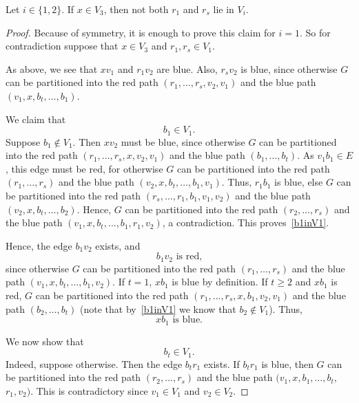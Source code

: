 \documentclass[a4paper,10pt]{article}
\begin{document}
\begin{claim}\label{xV3-b}
Let $i\in\{1,2\}$. If $x \in V_3$, then not both $r_1$ and $r_s$ lie in $V_i$.
\end{claim}
\begin{proof}
Because of symmetry, it is enough to prove this claim for $i=1$. So for contradiction suppose that $x \in V_3$ and $r_1,r_s\in V_1$.

As above, we see that $xv_1$ and $r_1v_2$ are blue. 
Also, $r_sv_2$ is blue, since otherwise $G$ can be partitioned into the red path $(r_1,\ldots,r_s,v_2,v_1)$ and the blue path $(v_1,x,b_t,\ldots,b_1)$.

We claim that
\begin{equation}\label{b1inV1}
b_1 \in V_1.
\end{equation}
Suppose  $b_1 \notin V_1$. Then $xv_2$ must be blue, since otherwise $G$ can be partitioned into the red path $(r_1,\ldots,r_s,x,v_2,v_1)$ and the blue path $(b_1,\ldots,b_t)$.
As $v_1b_1 \in E$, this edge must be red, for otherwise $G$ can be partitioned into the red path $(r_1,\ldots,r_s)$ and the blue path $(v_2,x,b_t,\ldots,b_1,v_1)$.
Thus, $r_1b_1$ is blue, else $G$ can be partitioned into the red path $(r_s,\ldots,r_1,b_1,v_1,v_2)$ and the blue path $(v_2,x,b_t,\ldots,b_2)$.
Hence, $G$ can be partitioned into the red path $(r_2,\ldots,r_s)$ and the blue path $(v_1,x,b_t,\ldots,b_1,r_1,v_2)$, a contradiction.
This proves~\eqref{b1inV1}.

Hence, the edge $b_1v_2$ exists, and 
\begin{equation}\label{b1v2red}
\text{$b_1v_2$ is red,}
\end{equation}
 since otherwise $G$ can be partitioned into the red path $(r_1,\ldots,r_s)$ and the blue path $(v_1,x,b_t,\ldots,b_1,v_2)$.
If $t=1$, $xb_1$ is blue by definition.
If $t \ge 2$ and $xb_1$ is red, $G$ can be partitioned into the red path $(r_1,\ldots,r_s,x,b_1,v_2,v_1)$ and the blue path $(b_2,\ldots,b_t)$ (note that by~\eqref{b1inV1} we know that $b_2\notin V_1$).
Thus, 
\begin{equation}\label{trueblue}
\text{$xb_1$ is blue.}
\end{equation}

We now show that 
\begin{equation}\label{btinV1}
b_t \in V_1.
\end{equation}
Indeed, suppose otherwise. Then the edge $b_tr_1$ exists.
If $b_tr_1$ is blue, then $G$ can be partitioned into the red path $(r_2,\ldots,r_s)$ and the blue path $(v_1,x,b_1,\ldots,b_t,$ $r_1,v_2)$.
This is contradictory since $v_1 \in V_1$ and $v_2 \in V_2$.


\end{proof}
\end{document}

